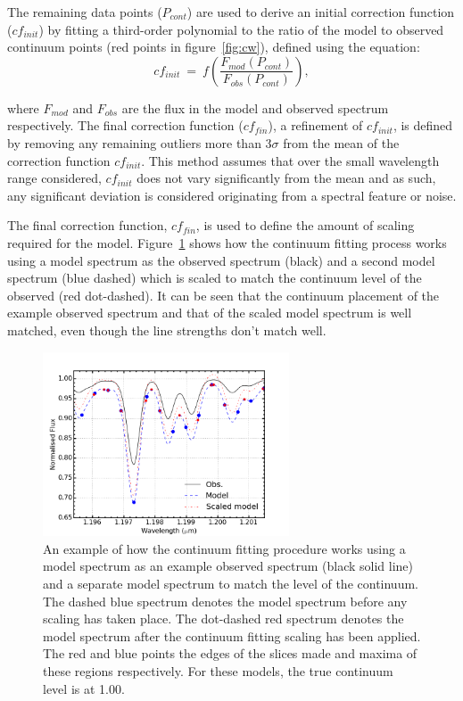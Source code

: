 The remaining data points ($P_{cont}$) are used to derive an initial correction function
($cf_{init}$) by fitting a third-order polynomial to the ratio of the model to observed continuum points (red points in figure~\ref{fig:cw}), defined using the equation:
\begin{equation}
    cf_{init}~=~f\left(\frac{F_{mod}(P_{cont})}{F_{obs}(P_{cont})}\right),
\end{equation}

\noindent where $F_{mod}$ and $F_{obs}$ are the flux in the model and observed spectrum respectively.
The final correction function ($cf_{fin}$), a refinement of $cf_{init}$,
is defined by removing any remaining outliers more than 3$\sigma$ from the mean of the correction function $cf_{init}$.
This method assumes that over the small wavelength range considered,
$cf_{init}$ does not vary significantly from the mean and as such, any significant deviation is considered originating from a spectral feature or noise.

The final correction function, $cf_{fin}$,
is used to define the amount of scaling required for the model.
Figure~\ref{fig:cftaction} shows how the continuum fitting process works using a model spectrum as the observed spectrum (black) and a second model spectrum
(blue dashed) which is scaled to match the continuum level of the observed
(red dot-dashed).
It can be seen that the continuum placement of the example observed spectrum and that of the scaled model spectrum is well matched, even though the line strengths don't match well.

\begin{figure}
 \centering
\includegraphics[width=0.65\textwidth]{JAnal/cftaction}
\caption[Example of continuum fitting]{
An example of how the continuum fitting procedure works using a model spectrum as
an example observed spectrum (black solid line)
and a separate model spectrum to match the level of the continuum.
The dashed blue spectrum denotes the model spectrum before any scaling has taken place.
The dot-dashed red spectrum denotes the model spectrum after the continuum fitting scaling has been applied.
The red and blue points the edges of the slices made and maxima of these regions respectively.
For these models, the true continuum level is at 1.00.\label{fig:cftaction}
         }
\end{figure}


